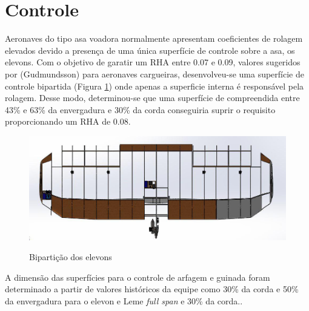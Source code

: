 \section{Controle}
Aeronaves do tipo asa voadora normalmente apresentam coeficientes de rolagem elevados devido a presença de uma única superfície de controle sobre a asa, os elevons. Com o objetivo de garatir um RHA entre 0.07 e 0.09, valores sugeridos por (Gudmundsson) para aeronaves cargueiras, desenvolveu-se uma superfície de controle bipartida (Figura \ref{biparticao_elevons}) onde apenas a superficie interna é responsável pela rolagem. Desse modo, determinou-se que uma superfície de compreendida entre 43\% e 63\% da envergadura e 30\% da corda conseguiria suprir o requisito proporcionando um RHA de 0.08.


\begin{figure}
\caption{Bipartição dos elevons}
\includegraphics[scale=0.6]{RELATORIOS/Figuras/biparticao_asa.jpg}
\label{biparticao_elevons}
\end{figure}

A dimensão das superfícies para o controle de arfagem e guinada foram determinado a partir de valores históricos da equipe como 30\% da corda e 50\% da envergadura para o elevon e Leme \textit{full span} e 30\% da corda..


 
